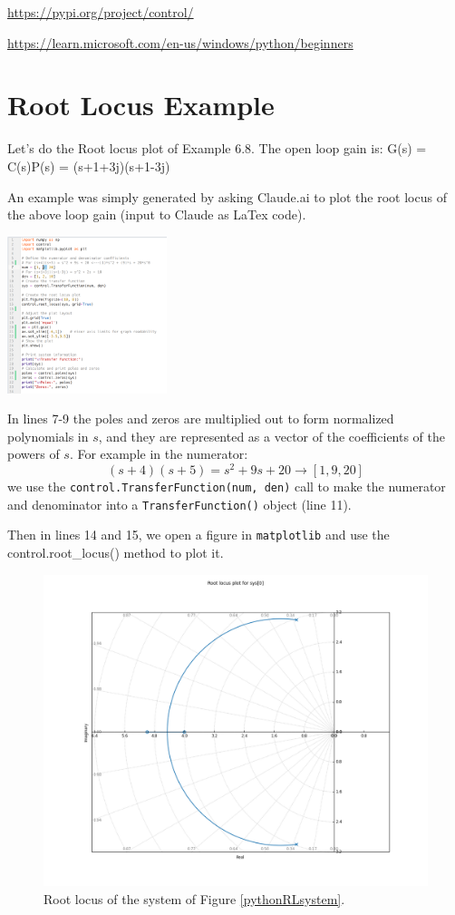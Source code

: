 \href{python control}{https://pypi.org/project/control/}

\href{Install Python on Windows}{https://learn.microsoft.com/en-us/windows/python/beginners}


\section{Root Locus Example}

Let's do the Root locus plot of Example 6.8.  The open loop gain is:
\beq\label{pythonRLsystem}
G(s) = C(s)P(s) =  {(s+1+3j)(s+1-3j)}
\eeq

An example was simply generated by asking Claude.ai to plot the root locus of the above loop gain (input to Claude as LaTex code).

\includegraphics[width=0.35\textwidth]{figs08/python_rl_code_Chapt08.png}

In lines 7-9 the poles and zeros are multiplied out to form normalized polynomials in $s$, and
they are represented as a vector of the coefficients of the powers of $s$.  For example in the
numerator:
\[
(s+4)(s+5) = s^2 + 9s + 20 \to [1, 9, 20]
\]
we use the {\tt control.TransferFunction(num, den)}  call to make the numerator and denominator into
a {\tt TransferFunction()} object (line 11).

Then in lines 14 and 15, we open a figure in {\tt matplotlib} and use the {control.root\_locus()} method to plot it.

\begin{figure}
    \includegraphics[width=\textwidth]{figs08/python_rl_result_Chapt08.png}
    \caption{Root locus of the system of Figure \ref{pythonRLsystem}.}\label{pythonRLoutput}
\end{figure}

